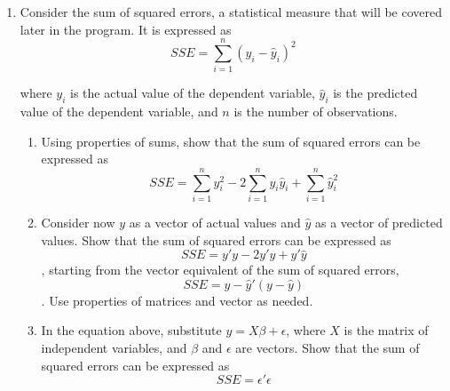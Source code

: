 \documentclass{article}
\begin{document}
\begin{enumerate}[resume]
    \item Consider the sum of squared errors, a statistical measure that will be covered later in the program. It is expressed as $$SSE = \sum_{i=1}^{n} (y_i - \hat{y}_i)^2$$

    where $y_i$ is the actual value of the dependent variable, $\hat{y}_i$ is the predicted value of the dependent variable, and $n$ is the number of observations.
\begin{enumerate}
    \item Using properties of sums, show that the sum of squared errors can be expressed as $$SSE = \sum_{i=1}^{n} y_i^2 - 2\sum_{i=1}^{n} y_i\hat{y}_i + \sum_{i=1}^{n} \hat{y}_i^2$$
    \item Consider now $y$ as a vector of actual values and $\hat{y}$ as a vector of predicted values. Show that the sum of squared errors can be expressed as $$SSE = y'y - 2y'\hat{y} + \hat{y}'\hat{y}$$, starting from the vector equivalent of the sum of squared errors, $$SSE = y-\hat{y}'(y-\hat{y})$$. Use properties of matrices and vector as needed.
    \item In the equation above, substitute $y = X\beta + \epsilon$, where $X$ is the matrix of independent variables, and $\beta$ and $\epsilon$ are vectors. Show that the sum of squared errors can be expressed as $$SSE = \epsilon'\epsilon$$
\end{enumerate}
\end{enumerate}
\end{document}
